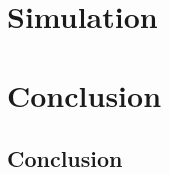 \documentclass[a4paper,11pt,twoside,openright]{report}
\renewcommand{\(}{\ensuremath{\left(}}
\renewcommand{\)}{\ensuremath{\right)}}
\begin{document}
	\part{Simulation}
		

	\part*{Conclusion}
		\chapter{Conclusion}





\end{document}

